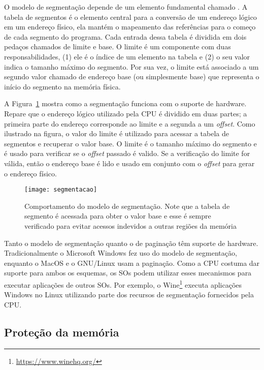O modelo de segmentação depende de um elemento fundamental chamado
. A tabela de segmentos é o elemento central
para a conversão de um endereço lógico em um endereço físico, ela mantém o
mapeamento das referências para o começo de cada segmento do programa. Cada
entrada dessa tabela é dividida em dois pedaços chamados de limite e base. O
limite é um componente com duas responsabilidades, (1) ele é o índice de um
elemento na tabela e (2) o seu valor indica o tamanho máximo do segmento. Por
sua vez, o limite está associado a um segundo valor chamado de endereço base
(ou simplesmente base) que representa o início do segmento na memória física.

A Figura~\ref{fig:segmentacao} mostra como a segmentação funciona com o suporte
de hardware. Repare que o endereço lógico utilizado pela CPU é dividido em duas
partes; a primeira parte do endereço corresponde ao limite e a segunda a um
\emph{offset}. Como ilustrado na figura, o valor do limite é utilizado para
acessar a tabela de segmentos e recuperar o valor base. O limite é o tamanho
máximo do segmento e é usado para verificar se o \emph{offset} passado é
valido. Se a verificação do limite for válida, então o endereço base é lido e
usado em conjunto com o \emph{offset} para gerar o endereço físico.

\begin{figure}[!h]
  \centering
  \texttt{[image: segmentacao]} 
	\caption[Comportamento do modelo de segmentação.]{Comportamento do modelo de segmentação. Note que a tabela de segmento é acessada para obter o valor base e esse é sempre verificado para evitar acessos indevidos a outras regiões da memória}
  \label{fig:segmentacao} 
\end{figure}

Tanto o modelo de segmentação quanto o de paginação têm suporte de hardware.
Tradicionalmente o Microsoft Windows fez uso do modelo de segmentação, enquanto
o MacOS e o GNU/Linux usam a paginação. Como a CPU costuma dar suporte para
ambos os esquemas, os SOs podem utilizar esses mecanismos para executar
aplicações de outros SOs. Por exemplo, o
Wine\footnote{\url{https://www.winehq.org/}} executa aplicações Windows no
Linux utilizando parte dos recursos de segmentação fornecidos pela CPU.

\subsection{Proteção da memória}
\label{sec:outros_mecanismos_memoria}

